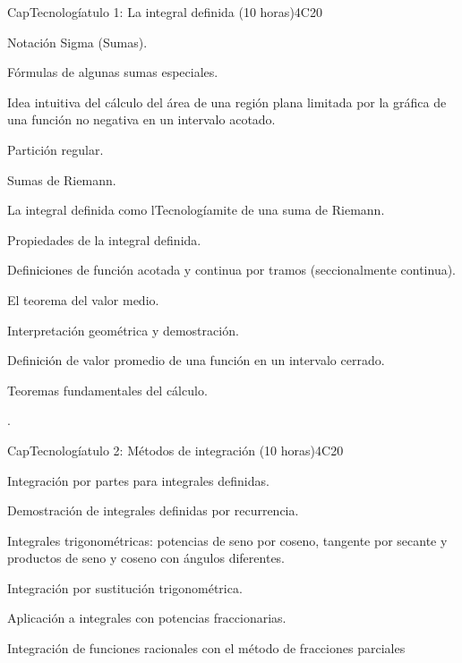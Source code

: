 \begin{syllabus}
\begin{unit}{CapTecnologíatulo 1: La integral definida (10 horas)}{}{}{4}{C20}
\begin{topics}
      \item Notación Sigma (Sumas). 
      \item Fórmulas de algunas sumas especiales.
      \item Idea intuitiva del cálculo del área de una región plana limitada por la gráfica de una función no negativa en un intervalo acotado.
      \item Partición regular.
      \item Sumas de Riemann.
      \item La integral definida como lTecnologíamite de una suma de Riemann. 
      \item Propiedades de la integral definida.
      \item Definiciones de función acotada y continua por tramos (seccionalmente continua).
      \item El teorema del valor medio.
      \item Interpretación geométrica y demostración. 
      \item Definición de valor promedio de una función en un intervalo cerrado.
      \item Teoremas fundamentales del cálculo.      
   \end{topics}

   \begin{learningoutcomes}
      \item .
   \end{learningoutcomes}
\end{unit}

\begin{unit}{CapTecnologíatulo 2: Métodos de integración (10 horas)}{}{}{4}{C20}


\begin{topics}
      \item Integración por partes para integrales definidas.
      \item Demostración de integrales definidas por recurrencia. 
      \item Integrales trigonométricas: potencias de seno por coseno, tangente por secante y productos de seno y coseno con ángulos diferentes.
      \item Integración por sustitución trigonométrica. 
      \item Aplicación a integrales con potencias fraccionarias.
      \item Integración de funciones racionales con el método de fracciones parciales
\end{topics}
   

\end{unit}
\end{syllabus}
